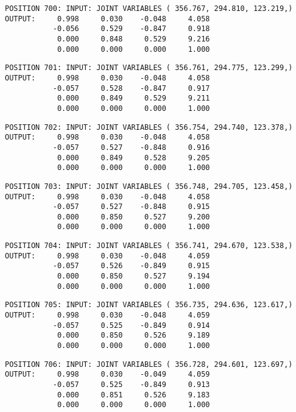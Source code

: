 \begin{verbatim}
POSITION 700: INPUT: JOINT VARIABLES ( 356.767, 294.810, 123.219,)
OUTPUT:     0.998     0.030    -0.048     4.058
           -0.056     0.529    -0.847     0.918
            0.000     0.848     0.529     9.216
            0.000     0.000     0.000     1.000
\end{verbatim} \pagebreak[1]\begin{verbatim}
POSITION 701: INPUT: JOINT VARIABLES ( 356.761, 294.775, 123.299,)
OUTPUT:     0.998     0.030    -0.048     4.058
           -0.057     0.528    -0.847     0.917
            0.000     0.849     0.529     9.211
            0.000     0.000     0.000     1.000
\end{verbatim} \pagebreak[1]\begin{verbatim}
POSITION 702: INPUT: JOINT VARIABLES ( 356.754, 294.740, 123.378,)
OUTPUT:     0.998     0.030    -0.048     4.058
           -0.057     0.527    -0.848     0.916
            0.000     0.849     0.528     9.205
            0.000     0.000     0.000     1.000
\end{verbatim} \pagebreak[1]\begin{verbatim}
POSITION 703: INPUT: JOINT VARIABLES ( 356.748, 294.705, 123.458,)
OUTPUT:     0.998     0.030    -0.048     4.058
           -0.057     0.527    -0.848     0.915
            0.000     0.850     0.527     9.200
            0.000     0.000     0.000     1.000
\end{verbatim} \pagebreak[1]\begin{verbatim}
POSITION 704: INPUT: JOINT VARIABLES ( 356.741, 294.670, 123.538,)
OUTPUT:     0.998     0.030    -0.048     4.059
           -0.057     0.526    -0.849     0.915
            0.000     0.850     0.527     9.194
            0.000     0.000     0.000     1.000
\end{verbatim} \pagebreak[1]\begin{verbatim}
POSITION 705: INPUT: JOINT VARIABLES ( 356.735, 294.636, 123.617,)
OUTPUT:     0.998     0.030    -0.048     4.059
           -0.057     0.525    -0.849     0.914
            0.000     0.850     0.526     9.189
            0.000     0.000     0.000     1.000
\end{verbatim} \pagebreak[1]\begin{verbatim}
POSITION 706: INPUT: JOINT VARIABLES ( 356.728, 294.601, 123.697,)
OUTPUT:     0.998     0.030    -0.049     4.059
           -0.057     0.525    -0.849     0.913
            0.000     0.851     0.526     9.183
            0.000     0.000     0.000     1.000
\end{verbatim} \pagebreak[1]\begin{verbatim}

\end{verbatim}
